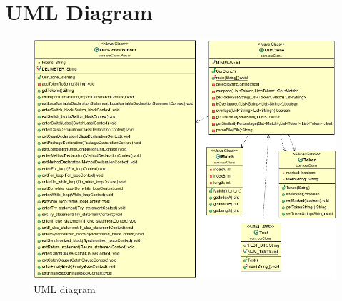 \section{UML Diagram}
\begin{figure} [ht]
\centering
\includegraphics[width=\textwidth]{Figures/UML}
\caption{UML diagram}
\label{fig:UML}
\end{figure}
\break